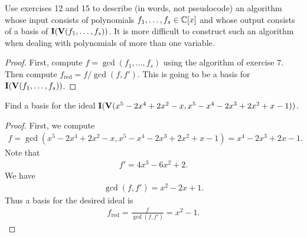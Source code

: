 \begin{exercise}{16}
Use exercises 12 and 15 to describe (in words, not pseudocode) an algorithm whose input consists of polynomials $f_1,\dots,f_s\in\mathbb{C}[x]$ and whose output consists of a basis of $\mathbf{I}(\mathbf{V}(f_1,\dots,f_s))$. 
It is more difficult to construct such an algorithm when dealing with polynomials of more than one variable.
\end{exercise}
\begin{proof}
First, compute $f = \gcd(f_1,\dots,f_s)$ using the algorithm of exercise $7$. 
Then compute $f_{\text{red}} = f/\gcd(f,f')$. 
This is going to be a basis for $\mathbf{I}(\mathbf{V}(f_1,\dots,f_s))$. 
\end{proof}

\begin{exercise}{17}
Find a basis for the ideal $\mathbf{I}(\mathbf{V}(x^5-2x^4+2x^2-x, x^5-x^4-2x^3+2x^2+x-1))$.
\end{exercise}
\begin{proof}
First, we compute
\begin{align*}
    f = \gcd(x^5-2x^4+2x^2-x, x^5-x^4-2x^3+2x^2+x-1) = x^4 - 2x^3 + 2x - 1.
\end{align*}
Note that
\begin{align*}
    f' = 4x^3 - 6x^2 + 2.
\end{align*}
We have
\begin{align*}
    \gcd(f,f') = x^2 - 2x + 1.
\end{align*}
Thus a basis for the desired ideal is
\begin{align*}
    f_{\text{red}} = \frac{f}{\gcd(f,f')} = x^2 - 1.
\end{align*}
\end{proof}
